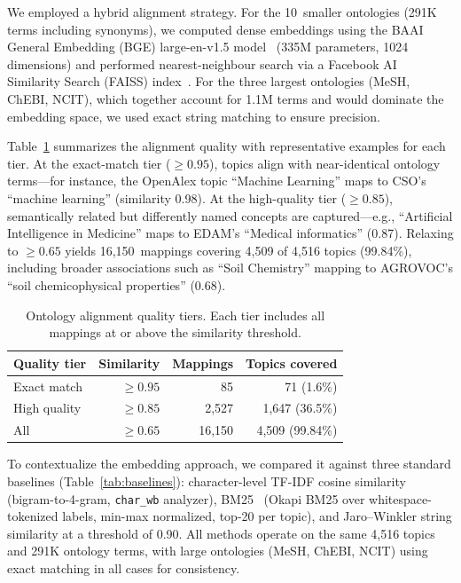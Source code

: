 We employed a hybrid alignment strategy. For the 10~smaller ontologies (291K
terms including synonyms), we computed dense embeddings using the BAAI General Embedding
(BGE) large-en-v1.5 model~\cite{xiao2024bge} (335M parameters, 1024
dimensions) and performed nearest-neighbour search via a Facebook AI
Similarity Search (FAISS) index~\cite{johnson2021faiss}. For the three largest ontologies (MeSH, ChEBI, NCIT), which
together account for 1.1M terms and would dominate the embedding space, we used
exact string matching to ensure precision.

Table~\ref{tab:ontology_tiers} summarizes the alignment quality with
representative examples for each tier. At the exact-match tier ($\geq 0.95$),
topics align with near-identical ontology terms---for instance, the OpenAlex
topic ``Machine Learning'' maps to CSO's ``machine learning'' (similarity
0.98). At the high-quality tier ($\geq 0.85$), semantically related but
differently named concepts are captured---e.g., ``Artificial Intelligence in
Medicine'' maps to EDAM's ``Medical informatics'' (0.87). Relaxing to
$\geq 0.65$ yields 16,150~mappings covering 4,509 of 4,516 topics (99.84\%),
including broader associations such as ``Soil Chemistry'' mapping to
AGROVOC's ``soil chemicophysical properties'' (0.68).

\begin{table}[t]
\centering
\caption{Ontology alignment quality tiers. Each tier includes all mappings at or
above the similarity threshold.}
\label{tab:ontology_tiers}
\small
\begin{tabular}{@{}l r r r@{}}
\toprule
\textbf{Quality tier} & \textbf{Similarity} & \textbf{Mappings} & \textbf{Topics covered} \\
\midrule
Exact match   & $\geq 0.95$ &     85 & 71 (1.6\%) \\
High quality  & $\geq 0.85$ &  2,527 & 1,647 (36.5\%) \\
All           & $\geq 0.65$ & 16,150 & 4,509 (99.84\%) \\
\bottomrule
\end{tabular}
\end{table}

To contextualize the embedding approach, we compared it against three
standard baselines (Table~\ref{tab:baselines}): character-level TF-IDF
cosine similarity (bigram-to-4-gram, \texttt{char\_wb} analyzer),
BM25~\cite{robertson2009bm25} (Okapi BM25 over whitespace-tokenized labels,
min-max normalized, top-20 per topic), and Jaro--Winkler string similarity
at a threshold of 0.90. All methods operate on the same 4,516 topics and
291K ontology terms, with large ontologies (MeSH, ChEBI, NCIT) using exact
matching in all cases for consistency.

